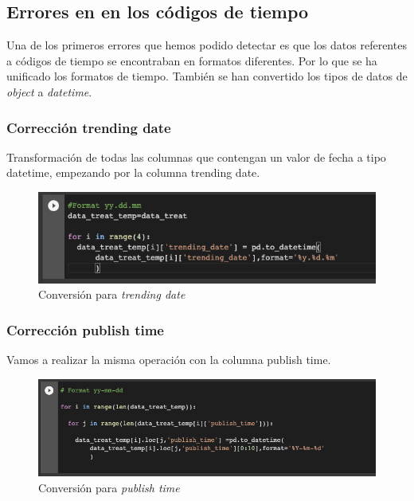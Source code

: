 \documentclass[a4paper,12pt]{article}
\begin{document}
\subsection{Errores en en los c\'odigos de tiempo}

Una de los primeros errores que hemos podido detectar es que los datos referentes a c\'odigos de tiempo se encontraban en formatos diferentes. Por lo que se ha unificado los formatos de tiempo. Tambi\'en se han convertido los tipos de datos de {\itshape object} a {\itshape datetime}.

\subsubsection{Correcci\'on  trending date}

Transformaci\'on de todas las columnas que contengan un valor de fecha a tipo datetime, empezando por la columna trending date.

\begin{figure}[h!]
 \centering
\includegraphics[width=13cm]{correc_trending.png}
\caption{Conversi\'on para {\itshape trending date}}
\label{fig:trend_date}
\end{figure}

\subsubsection{Correcci\'on  publish time}
Vamos a realizar la misma operaci\'on con la columna publish time.

\begin{figure}[h!]
\centering
\includegraphics[width=13cm]{correc_publish.png}
\caption{Conversi\'on para {\itshape publish time}}
\label{fig:pub_date}
\end{figure}
\end{document}
